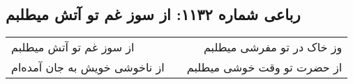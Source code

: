 \begin{center}
\section*{رباعی شماره ۱۱۳۲: از سوز غم تو آتش میطلبم}
\label{sec:1132}
\begin{longtable}{l p{0.5cm} r}
از سوز غم تو آتش میطلبم
&&
وز خاک در تو مفرشی میطلبم
\\
از ناخوشی خویش به جان آمده‌ام
&&
از حضرت تو وقت خوشی میطلبم
\\
\end{longtable}
\end{center}
